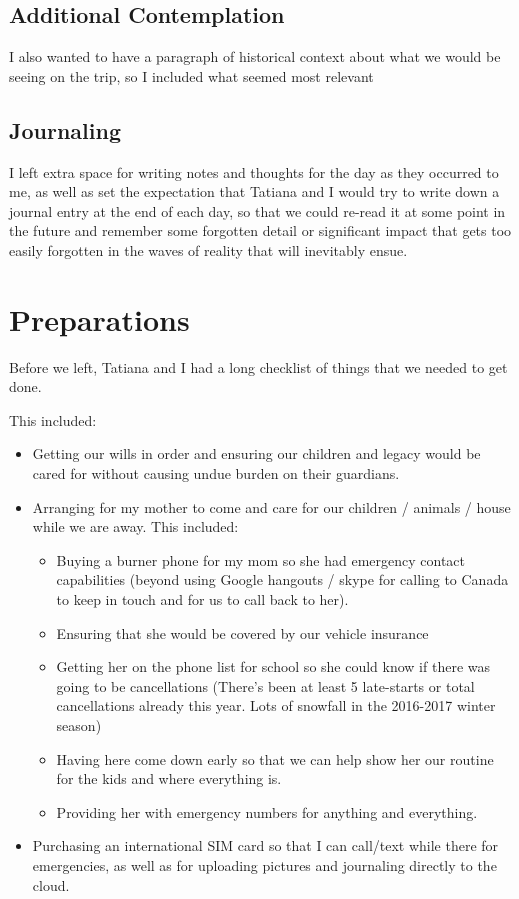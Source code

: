 \documentclass[letterpaper]{report}
\begin{document}
\subsection{Additional Contemplation}
I also wanted to have a paragraph of historical context about what we would be
seeing on the trip,
so I included what seemed most relevant

\subsection{Journaling}
I left extra space for writing notes and thoughts for the day as they occurred 
to me,
as well as set the expectation that Tatiana and I would try to write down a
journal entry at the end of each day, so that we could re-read it at some 
point in the future and remember some forgotten detail or significant impact
that gets too easily forgotten in the waves of reality that will inevitably
ensue.

\section{Preparations}
Before we left, Tatiana and I had a long checklist
of things that we needed to get done.

This included:
\begin{itemize}
    \item Getting our wills in order and ensuring our children and legacy would
    be cared for without causing undue burden on their guardians.
    \item Arranging for my mother to come and care for our children / animals / house while we are away.  This included:
    \begin{itemize}
        \item Buying a burner phone for my mom so she had emergency contact 
        capabilities (beyond using Google hangouts / skype for calling to
        Canada to keep in touch and for us to call back to her).
        \item Ensuring that she would be covered by our vehicle insurance
        \item Getting her on the phone list for school so she could know if 
        there was going to be cancellations
        (There's been at least 5 late-starts or total cancellations already 
        this year. Lots of snowfall in the 2016-2017 winter season)
        \item Having here come down early so that we can help show her our routine for the kids and where everything is.
        \item Providing her with emergency numbers for anything and everything.
    \end{itemize}
    \item Purchasing an international SIM card so that I can call/text while
    there for emergencies,
    as well as for uploading pictures and journaling
    directly to the cloud.
\end{itemize}
\end{document}
